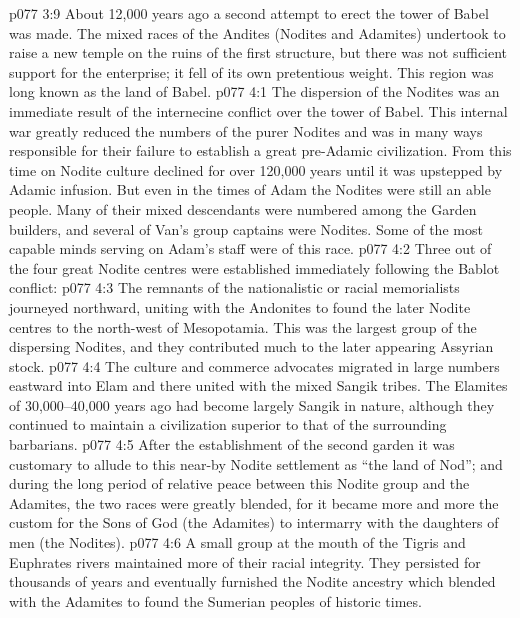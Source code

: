 \vs p077 3:9 \pc About 12,000 years ago a second attempt to erect the tower of Babel was made. The mixed races of the Andites (Nodites and Adamites) undertook to raise a new temple on the ruins of the first structure, but there was not sufficient support for the enterprise; it fell of its own pretentious weight. This region was long known as the land of Babel.
\vs p077 4:1 The dispersion of the Nodites was an immediate result of the internecine conflict over the tower of Babel. This internal war greatly reduced the numbers of the purer Nodites and was in many ways responsible for their failure to establish a great pre\hyp{}Adamic civilization. From this time on Nodite culture declined for over 120,000 years until it was upstepped by Adamic infusion. But even in the times of Adam the Nodites were still an able people. Many of their mixed descendants were numbered among the Garden builders, and several of Van’s group captains were Nodites. Some of the most capable minds serving on Adam’s staff were of this race.
\vs p077 4:2 Three out of the four great Nodite centres were established immediately following the Bablot conflict:
\vs p077 4:3 \bibnobreakspace {} The remnants of the nationalistic or racial memorialists journeyed northward, uniting with the Andonites to found the later Nodite centres to the north\hyp{}west of Mesopotamia. This was the largest group of the dispersing Nodites, and they contributed much to the later appearing Assyrian stock.
\vs p077 4:4 \bibnobreakspace {} The culture and commerce advocates migrated in large numbers eastward into Elam and there united with the mixed Sangik tribes. The Elamites of 30,000--40,000 years ago had become largely Sangik in nature, although they continued to maintain a civilization superior to that of the surrounding barbarians.
\vs p077 4:5 After the establishment of the second garden it was customary to allude to this near-by Nodite settlement as “the land of Nod”; and during the long period of relative peace between this Nodite group and the Adamites, the two races were greatly blended, for it became more and more the custom for the Sons of God (the Adamites) to intermarry with the daughters of men (the Nodites).
\vs p077 4:6 \bibnobreakspace {} A small group at the mouth of the Tigris and Euphrates rivers maintained more of their racial integrity. They persisted for thousands of years and eventually furnished the Nodite ancestry which blended with the Adamites to found the Sumerian peoples of historic times.
